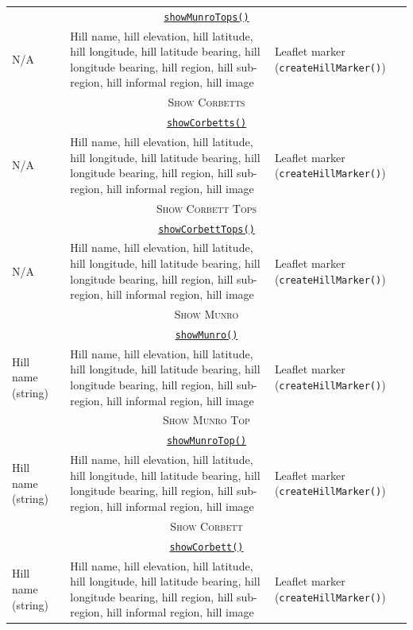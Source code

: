 \documentclass[11pt, english]{article}
\begin{document}
\begin{center}
\begin{longtable}{p{4cm}p{6cm}p{2cm}}
		\hline
		\multicolumn{3}{c}{\underline{\texttt{showMunroTops()}}}\\
		N/A & Hill name, hill elevation, hill latitude, hill longitude, hill latitude bearing, hill longitude bearing, hill region, hill sub-region, hill informal region, hill image & Leaflet marker (\texttt{createHillMarker()})\\
		\hline
		\multicolumn{3}{c}{\textsc{Show Corbetts}}\\
		\hline
		\multicolumn{3}{c}{\underline{\texttt{showCorbetts()}}}\\
		N/A & Hill name, hill elevation, hill latitude, hill longitude, hill latitude bearing, hill longitude bearing, hill region, hill sub-region, hill informal region, hill image & Leaflet marker (\texttt{createHillMarker()})\\
		\hline
		\multicolumn{3}{c}{\textsc{Show Corbett Tops}}\\
		\hline
		\multicolumn{3}{c}{\underline{\texttt{showCorbettTops()}}}\\
		N/A & Hill name, hill elevation, hill latitude, hill longitude, hill latitude bearing, hill longitude bearing, hill region, hill sub-region, hill informal region, hill image & Leaflet marker (\texttt{createHillMarker()})\\
		\hline
		\multicolumn{3}{c}{\textsc{Show Munro}}\\
		\hline
		\multicolumn{3}{c}{\underline{\texttt{showMunro()}}}\\
		Hill name (string) & Hill name, hill elevation, hill latitude, hill longitude, hill latitude bearing, hill longitude bearing, hill region, hill sub-region, hill informal region, hill image & Leaflet marker (\texttt{createHillMarker()})\\
		\hline
		\multicolumn{3}{c}{\textsc{Show Munro Top}}\\
		\hline
		\multicolumn{3}{c}{\underline{\texttt{showMunroTop()}}}\\
		Hill name (string) & Hill name, hill elevation, hill latitude, hill longitude, hill latitude bearing, hill longitude bearing, hill region, hill sub-region, hill informal region, hill image & Leaflet marker (\texttt{createHillMarker()})\\
		\hline
		\multicolumn{3}{c}{\textsc{Show Corbett}}\\
		\hline
		\multicolumn{3}{c}{\underline{\texttt{showCorbett()}}}\\
		Hill name (string) & Hill name, hill elevation, hill latitude, hill longitude, hill latitude bearing, hill longitude bearing, hill region, hill sub-region, hill informal region, hill image & Leaflet marker (\texttt{createHillMarker()})\\

\end{longtable}
\end{center}
\end{document}
